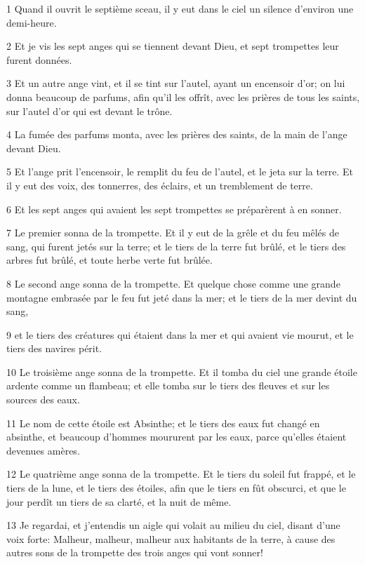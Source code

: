 \par 1 Quand il ouvrit le septième sceau, il y eut dans le ciel un silence d'environ une demi-heure.
\par 2 Et je vis les sept anges qui se tiennent devant Dieu, et sept trompettes leur furent données.
\par 3 Et un autre ange vint, et il se tint sur l'autel, ayant un encensoir d'or; on lui donna beaucoup de parfums, afin qu'il les offrît, avec les prières de tous les saints, sur l'autel d'or qui est devant le trône.
\par 4 La fumée des parfums monta, avec les prières des saints, de la main de l'ange devant Dieu.
\par 5 Et l'ange prit l'encensoir, le remplit du feu de l'autel, et le jeta sur la terre. Et il y eut des voix, des tonnerres, des éclairs, et un tremblement de terre.
\par 6 Et les sept anges qui avaient les sept trompettes se préparèrent à en sonner.
\par 7 Le premier sonna de la trompette. Et il y eut de la grêle et du feu mêlés de sang, qui furent jetés sur la terre; et le tiers de la terre fut brûlé, et le tiers des arbres fut brûlé, et toute herbe verte fut brûlée.
\par 8 Le second ange sonna de la trompette. Et quelque chose comme une grande montagne embrasée par le feu fut jeté dans la mer; et le tiers de la mer devint du sang,
\par 9 et le tiers des créatures qui étaient dans la mer et qui avaient vie mourut, et le tiers des navires périt.
\par 10 Le troisième ange sonna de la trompette. Et il tomba du ciel une grande étoile ardente comme un flambeau; et elle tomba sur le tiers des fleuves et sur les sources des eaux.
\par 11 Le nom de cette étoile est Absinthe; et le tiers des eaux fut changé en absinthe, et beaucoup d'hommes moururent par les eaux, parce qu'elles étaient devenues amères.
\par 12 Le quatrième ange sonna de la trompette. Et le tiers du soleil fut frappé, et le tiers de la lune, et le tiers des étoiles, afin que le tiers en fût obscurci, et que le jour perdît un tiers de sa clarté, et la nuit de même.
\par 13 Je regardai, et j'entendis un aigle qui volait au milieu du ciel, disant d'une voix forte: Malheur, malheur, malheur aux habitants de la terre, à cause des autres sons de la trompette des trois anges qui vont sonner!

